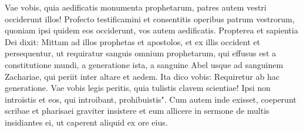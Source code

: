 \begin{biblechapter}
\verse Vae vobis, quia aedificatis monumenta prophetarum, patres autem vestri occiderunt illos! 
\verse Profecto testificamini et consentitis operibus patrum vestrorum, quoniam ipsi quidem eos occiderunt, vos autem aedificatis. 
\verse Propterea et sapientia Dei dixit: Mittam ad illos prophetas et apostolos, et ex illis occident et persequentur,  
\verse ut requiratur sanguis omnium prophetarum, qui effusus est a constitutione mundi, a generatione ista, 
\verse a sanguine Abel usque ad sanguinem Zachariae, qui periit inter altare et aedem. Ita dico vobis: Requiretur ab hac generatione.  
\verse Vae vobis legis peritis, quia tulistis clavem scientiae! Ipsi non introistis et eos, qui introibant, prohibuistis". 
\verse Cum autem inde exisset, coeperunt scribae et pharisaei graviter insistere et eum allicere in sermone de multis 
\verse insidiantes ei, ut caperent aliquid ex ore eius. 
\end{biblechapter}

